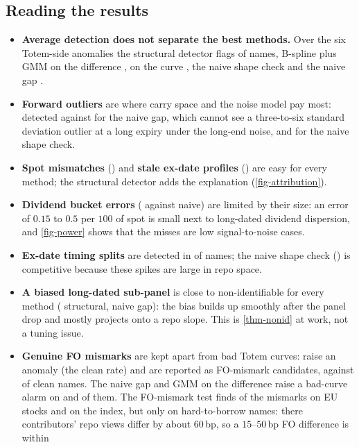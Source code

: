 \subsection{Reading the results}
\begin{itemize}
\item \textbf{Average detection does not separate the best methods.} Over the six Totem-side anomalies the structural
detector flags \vMeanStruct{} of names, B-spline plus GMM on the difference \vMeanGmmDiff, on the curve \vMeanGmmCurve,
the naive shape check \vMeanShape{} and the naive gap \vMeanNaive.
\item \textbf{Forward outliers} are where carry space and the noise model pay most: \vFwdStruct{} detected against
\vFwdNaive{} for the naive gap, which cannot see a three-to-six standard deviation outlier at a long expiry under the
long-end noise, and \vFwdShape{} for the naive shape check.
\item \textbf{Spot mismatches} (\vSpotStruct) and \textbf{stale ex-date profiles} (\vSeasonStruct) are easy for every
method; the structural detector adds the explanation (\cref{fig-attribution}).
\item \textbf{Dividend bucket errors} (\vBucketStruct{} against \vBucketNaive{} naive) are limited by their size: an
error of $0.15$ to $0.5$ per $100$ of spot is small next to long-dated dividend dispersion, and \cref{fig-power} shows
that the misses are low signal-to-noise cases.
\item \textbf{Ex-date timing splits} are detected in \vTimingStruct{} of names; the naive shape check (\vTimingShape) is
competitive because these spikes are large in repo space.
\item \textbf{A biased long-dated sub-panel} is close to non-identifiable for every method (\vPanelStruct{} structural,
\vPanelNaive{} naive gap): the bias builds up smoothly after the panel drop and mostly projects onto a repo slope. This
is \cref{thm-nonid} at work, not a tuning issue.
\item \textbf{Genuine FO mismarks} are kept apart from bad Totem curves: \vFoStruct{} raise an anomaly (the clean rate)
and \vFoMismark{} are reported as FO-mismark candidates, against \vFoClean{} of clean names. The naive gap and GMM on the
difference raise a bad-curve alarm on \vFoNaive{} and \vFoGmmDiff{} of them. The FO-mismark test finds
\vFoMismarkEuStock{} of the mismarks on EU stocks and \vFoMismarkIndex{} on the index, but only \vFoMismarkHtb{} on
hard-to-borrow names: there contributors' repo views differ by about $60$\,bp, so a $15$--$50$\,bp FO difference is within

\end{itemize}

